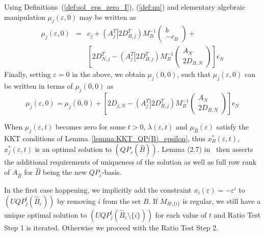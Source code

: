 \documentclass[a4paper]{article}
\begin{document}
Using Definitions~(\ref{def:sol_eps_zero_I}), (\ref{def:nu}) and elementary
algebraic manipulation
$\mu_{j}(\varepsilon,0)$ may be written as
\begin{eqnarray*}
  \mu_{j}\left(\varepsilon, 0\right) &=& c_{j} +
  \left(A_{j}^{T} \left|\right. 2D_{B, j}^{T} \right)
  M_{B}^{-1}
  \left(\begin{array}{c}
          b \\
	  \hline
	  -c_{B}
	\end{array}
  \right) + \\
  &&
  \left[2D_{N, j}^{T} -
    \left(A_{j}^{T} \left|\right. 2D_{B, j}^{T} \right)
    M_{B}^{-1}
    \left(\begin{array}{c}
            A_{N} \\
	    \hline
	    2D_{B,N}
	  \end{array}
    \right)
  \right]\epsilon_{N} 
\end{eqnarray*}
Finally, setting $\varepsilon=0$ in the above, we obtain $\mu_{j}(0, 0)$, such
that $\mu_{j}(\varepsilon, 0)$ can be written in terms of $\mu_{j}(0,0)$ as
\begin{equation}
\label{eq:mu_j_eps_zero}
\mu_{j}\left(\varepsilon, 0\right) =
  \mu_{j}\left(0,0\right) +
    \left[
    2D_{j, N} - \left(A_{j}^{T} \left| \right. 2D_{B, j}^{T} \right)
    M_{B}^{-1}
    \left(\begin{array}{c}
            A_{N} \\
	    \hline
	    2D_{B, N}
	  \end{array}
    \right)
  \right]\epsilon_{N}
\end{equation}

When $\mu_{j}\left(\varepsilon, t\right)$ becomes zero for some $t > 0$,
$\lambda\left(\varepsilon, t\right)$ and $\mu_{\hat{B}}(\varepsilon)$ satisfy
the KKT conditions of Lemma~\ref{lemma:KKT_QP(B)_epsilon}, thus
$x_{B}^{*}\left(\varepsilon, t\right)$,
$x_{j}^{*}\left(\varepsilon, t\right)$ is an optimal solution to
$(QP_{\varepsilon}(\hat{B}))$. Lemma (2.7) in~\cite{Sven} then asserts the
additional requirements of uniqueness of the solution as well as full row rank
of $A_{\hat{B}}$ for $\hat{B}$ being the new $QP_{\varepsilon}$-basis.

In the first case happening, we implicitly add the constraint
$x_{i}(\varepsilon)=-\varepsilon^{i}$
to $(UQP_{j}^{t}(\hat{B}_{\varepsilon}))$ by removing $i$ from the set $B$.
If $M_{B \setminus \{i\}}$ is regular,
we still have a unique optimal solution to
$(UQP_{j}^{t}(\hat{B}_{\varepsilon} \setminus \{i\}))$ for each value of
$t$ and Ratio Test Step 1 is
iterated. Otherwise we proceed with the Ratio Test Step 2.
\end{document}
